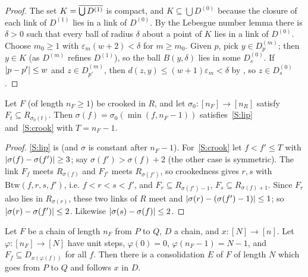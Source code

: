 \begin{proof}
The set $K=\overline{\bigcup D^{(1)}}$ is compact, and $K\subseteq\bigcup D^{(0)}$ because the closure of each link of $D^{(1)}$
lies in a link of $D^{(0)}$. By the Lebesgue number lemma there is $\delta>0$ such that every ball of radius $\delta$ about a
point of $K$ lies in a link of $D^{(0)}$. Choose $m_0\ge1$ with $\varepsilon_m(w+2)<\delta$ for $m\ge m_0$. Given $p$, pick
$y\in D^{(m)}_p$; then $y\in K$ (as $D^{(m)}$ refines $D^{(1)}$), so the ball $B(y,\delta)$ lies in some $D^{(0)}_s$. If
$\left\lvert p-p'\right\rvert\le w$ and $z\in D^{(m)}_{p'}$, then $d(z,y)\le(w+1)\varepsilon_m<\delta$ by , so $z\in
D^{(0)}_s$.
\end{proof}


\begin{lemma}\label{lem:setting-of-crooked}
Let $F$ (of length $n_F\ge1$) be crooked in $R$, and let $\sigma_0\colon[n_F]\to[n_R]$ satisfy $F_t\subseteq R_{\sigma_0(t)}$.
Then $\sigma(f)=\sigma_0(\min(f,n_F-1))$ satisfies~\ref{S:lip} and~\ref{S:crook} with $T=n_F-1$.
\end{lemma}

\begin{proof}
\ref{S:lip} is  (and $\sigma$ is constant after $n_F-1$). For~\ref{S:crook} let $f<f'\le T$ with
$\left\lvert \sigma(f)-\sigma(f')\right\rvert\ge3$; say $\sigma(f')>\sigma(f)+2$ (the other case is symmetric). The link $F_f$ meets
$R_{\sigma(f)}$ and $F_{f'}$ meets $R_{\sigma(f')}$, so crookedness gives $r,s$ with $\mathrm{Btw}(f,r,s,f')$, i.e.
$f<r<s<f'$, and $F_r\subseteq R_{\sigma(f')-1}$, $F_s\subseteq R_{\sigma(f)+1}$. Since $F_r$ also lies in $R_{\sigma(r)}$, these
two links of $R$ meet and $\left\lvert \sigma(r)-(\sigma(f')-1)\right\rvert\le1$; so $\left\lvert \sigma(r)-\sigma(f')\right\rvert\le2$. Likewise
$\left\lvert \sigma(s)-\sigma(f)\right\rvert\le2$.
\end{proof}


\begin{lemma}\label{lem:consolidation-of-lift}
Let $F$ be a chain of length $n_F$ from $P$ to $Q$, $D$ a chain, and $x\colon[N]\to[n]$. Let $\varphi\colon[n_F]\to[N]$ have
unit steps, $\varphi(0)=0$, $\varphi(n_F-1)=N-1$, and $F_f\subseteq D_{x(\varphi(f))}$ for all $f$. Then there is a
consolidation $E$ of $F$ of length $N$ which goes from $P$ to $Q$ and follows $x$ in $D$.
\end{lemma}


